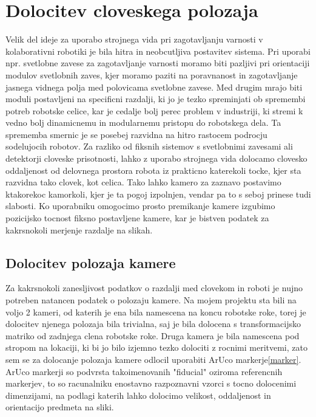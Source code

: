 \documentclass[a4paper,twoside,openright,12pt,slovene]{book}
\begin{document}
\section{Dolocitev cloveskega polozaja} Velik del ideje za uporabo strojnega vida pri zagotavljanju varnosti v kolaborativni robotiki je bila hitra in neobcutljiva postavitev sistema. Pri uporabi npr. svetlobne zavese za zagotavljanje varnosti moramo biti pazljivi pri orientaciji modulov svetlobnih zaves, kjer moramo paziti na poravnanost in zagotavljanje jasnega vidnega polja med polovicama svetlobne zavese. Med drugim mrajo biti moduli postavljeni na specificni razdalji, ki jo je tezko spreminjati ob spremembi potreb robotske celice, kar je cedalje bolj perec problem v industriji, ki stremi k vedno bolj dinamicnemu in modularnemu pristopu do robotskega dela. Ta sprememba smernic je se posebej razvidna na hitro rastocem podrocju sodelujocih robotov. Za razliko od fiksnih sistemov s svetlobnimi zavesami ali detektorji cloveske prisotnosti, lahko z uporabo strojnega vida dolocamo clovesko oddaljenost od delovnega prostora robota iz prakticno katerekoli tocke, kjer sta razvidna tako clovek, kot celica. Tako lahko kamero za zaznavo postavimo ktakorekoc kamorkoli, kjer je ta pogoj izpolnjen, vendar pa to s seboj prinese tudi slabosti. Ko uporabniku omogocimo prosto premikanje kamere izgubimo pozicijsko tocnost fiksno postavljene kamere, kar je bistven podatek za kakrsnokoli merjenje razdalje na slikah.

\subsection{Dolocitev polozaja kamere} Za kakrsnokoli zanesljivost podatkov o razdalji med clovekom in roboti je nujno potreben natancen podatek o polozaju kamere. Na mojem projektu sta bili na voljo 2 kameri, od katerih je ena bila namescena na koncu robotske roke, torej je dolocitev njenega polozaja bila trivialna, saj je bila dolocena s transformacijsko matriko od zadnjega clena robotske roke. Druga kamera je bila namescena pod stropom na lokaciji, ki bi jo bilo izjemno tezko dolociti z rocnimi meritvemi, zato sem se za dolocanje polozaja kamere odlocil uporabiti ArUco markerje\ref{marker}. ArUco markerji so podvrsta takoimenovanih "fiducial" oziroma referencnih markerjev, to so racunalniku enostavno razpoznavni vzorci s tocno dolocenimi dimenzijami, na podlagi katerih lahko dolocimo velikost, oddaljenost in orientacijo predmeta na sliki. 
\end{document}
